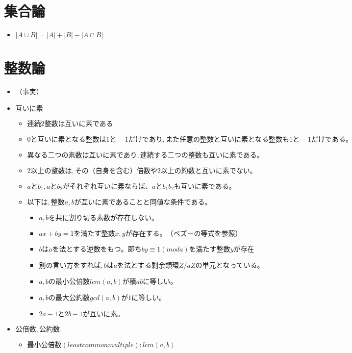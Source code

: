 \documentclass[dvipdfmx,uplatex]{jsarticle}
\begin{document}
\section{集合論}
\begin{itemize}
	\item $ |A \cup B| = |A| + |B| - |A \cap B|$
\end{itemize}

\section{整数論}
\begin{itemize}
	\item（事実）
	\item $ 互いに素$
	\begin{itemize}
		\item $ 連続2整数は互いに素である$
		\item $ 0 と互いに素となる整数は 1 と −1 だけであり,また任意の整数と互いに素となる整数も 1 と −1 だけである。$
		\item $ 異なる二つの素数は互いに素であり,連続する二つの整数も互いに素である。$
		\item $ 2 以上の整数は,その（自身を含む）倍数や 2 以上の約数と互いに素でない。$
		\item $ a と b_1,a と b_2 がそれぞれ互いに素ならば、a と b_1b_2 も互いに素である。$
		\item $ 以下は,整数 a, b が互いに素であることと同値な条件である。$
		\begin{itemize}
			\item $ a, b を共に割り切る素数が存在しない。$
			\item $ ax + by = 1 を満たす整数 x, y が存在する。（ベズーの等式を参照）$
			\item $ b は a を法とする逆数をもつ。即ち by ≡ 1 (mod a) を満たす整数 y が存在$
				\item $別の言い方をすれば,b は a を法とする剰余類環 Z/aZ の単元となっている。$
			\item $ a, b の最小公倍数 lcm(a, b) が積 ab に等しい。$
			\item $ a, b の最大公約数 gcd(a, b) が 1 に等しい。$
			\item $ 2a − 1 と 2b − 1 が互いに素。$
		\end{itemize}
	\end{itemize}
	\item $ 公倍数,公約数$
	\begin{itemize}
		\item $ 最小公倍数(least common multiple): lcm(a,b)$

\end{itemize}
\end{itemize}
\end{document}
